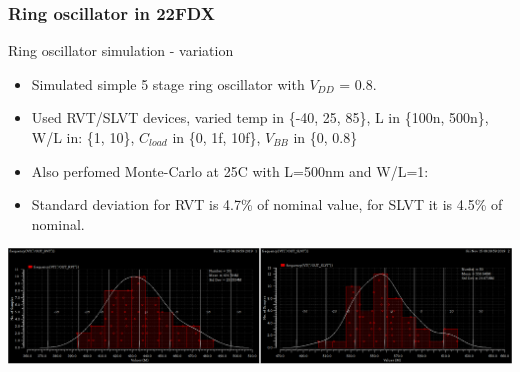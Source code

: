 \documentclass[t, screen, aspectratio=43]{beamer}
\begin{document}
\begin{frame}
	\frametitle{Ring oscillator in 22FDX}
	\begin{block}{Ring oscillator simulation - variation}
		\begin{itemize}
			\scriptsize
			\item Simulated simple 5 stage ring oscillator with $V_{DD}$ = 0.8.
			\item Used RVT/SLVT devices, varied temp in \{-40, 25, 85\}, L in \{100n, 500n\}, W/L in: \{1, 10\}, $C_{load}$ in \{0, 1f, 10f\}, $V_{BB}$ in \{0, 0.8\}
			\item Also perfomed Monte-Carlo at 25C with L=500nm and W/L=1:
			\item Standard deviation for RVT is 4.7\% of nominal value, for SLVT it is 4.5\% of nominal.
		\end{itemize}    
		\center\includegraphics[width=0.8\linewidth]{freq_var.png}
	\end{block}
\end{frame}







\end{document}
